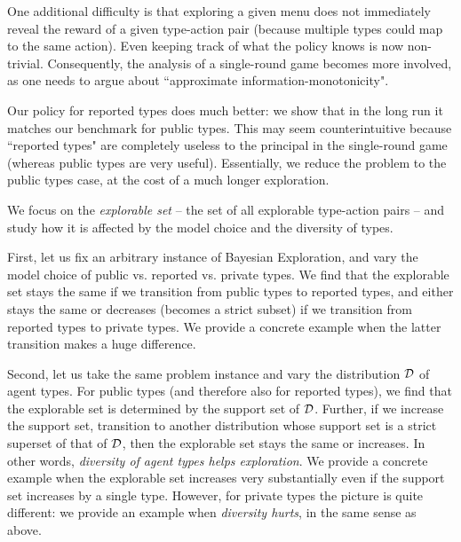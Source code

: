 One additional difficulty is that exploring a given menu does not immediately reveal the reward of a given type-action pair (because multiple types could map to the same action). Even keeping track of what the policy knows is now non-trivial. Consequently, the analysis of a single-round game becomes more involved, as one needs to argue about ``approximate information-monotonicity".
 
Our policy for reported types does much better: we show that in the long run it matches our benchmark for public types. This may seem counterintuitive because ``reported types" are completely useless to the principal in the single-round game (whereas public types are very useful). Essentially, we reduce the problem to the public types case, at the cost of a much longer exploration.

We focus on the \emph{explorable set} -- the set of all explorable type-action pairs -- and study how  it is affected by the model choice and the diversity of types. 

First, let us fix an arbitrary instance of Bayesian Exploration, and vary the model choice of public vs. reported vs. private types. We find that the explorable set stays the same if we transition from public types to reported types, and either stays the same or decreases (becomes a strict subset) if we transition from reported types to private types. We provide a concrete example when the latter transition makes a huge difference. 

Second, let us take the same problem instance and vary the distribution $\mathcal{D}$ of agent types. For public types (and therefore also for reported types), we find that the explorable set is determined by the support set of $\mathcal{D}$. Further, if we increase the support set, \ie transition to another distribution whose support set is a strict superset of that of $\mathcal{D}$, then the explorable set stays the same or increases. In other words, \emph{diversity of agent types helps exploration}. We provide a concrete example when the explorable set increases very substantially even if the support set increases by a single type. However, for private types the picture is quite different: we provide an example when \emph{diversity hurts}, in the same sense as above. 